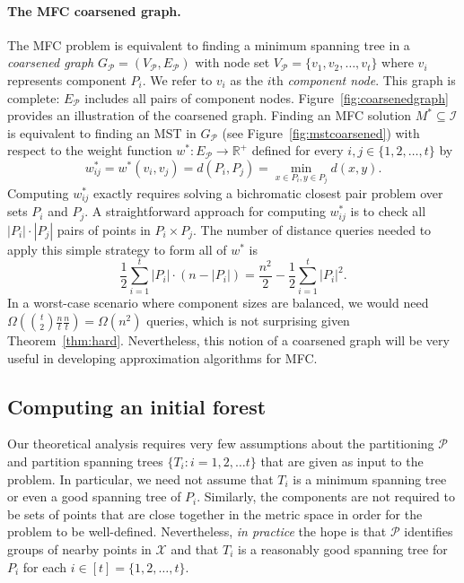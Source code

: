 \paragraph{The MFC coarsened graph.} The  MFC problem is equivalent to finding a minimum spanning tree in a \textit{coarsened graph} $G_\mathcal{P} = (V_\mathcal{P}, E_\mathcal{P})$ with node set $V_\mathcal{P} = \{v_1, v_2, \hdots, v_t\}$ where $v_i$ represents component $P_i$. We refer to $v_i$ as the $i$th \textit{component node}. This graph is complete: $E_\mathcal{P}$ includes all pairs of component nodes. Figure~\ref{fig:coarsenedgraph} provides an illustration of the coarsened graph. Finding an MFC solution $M^* \subseteq \mathcal{I}$ is equivalent to finding an MST in $G_\mathcal{P}$ (see Figure~\ref{fig:mstcoarsened}) with respect to the weight function $w^* \colon E_\mathcal{P} \rightarrow \mathbb{R}^+$ defined for every $i, j \in \{1,2, \hdots, t\}$ by
\begin{equation}
	\label{eq:wstar}
	w^*_{ij} = w^*(v_i, v_j) = d(P_i, P_j) = \min_{x \in P_i, y\in P_j} d(x,y).
\end{equation}
Computing $w_{ij}^*$ exactly requires solving a bichromatic closest pair problem over sets $P_i$ and $P_j$. A straightforward approach for computing $w_{ij}^*$ is to check all $|P_i|\cdot |P_j|$ pairs of points in $P_i \times P_j$. The number of distance queries needed to apply this simple strategy to form all of $w^*$ is
\begin{equation*} 
	\frac{1}{2}\sum_{i = 1}^t |P_i| \cdot (n - |P_i|) = \frac{n^2}{2} - \frac{1}{2} \sum_{i = 1}^t |P_i|^2.
\end{equation*}
In a worst-case scenario where component sizes are balanced, we would need
$\Omega\left({t \choose 2} \frac{n}{t} \frac{n}{t}\right) = \Omega(n^2)$ 
queries, which is not surprising given Theorem~\ref{thm:hard}. Nevertheless, this notion of a coarsened graph will be very useful in developing approximation algorithms for MFC.

\subsection{Computing an initial forest}
\label{sec:initialforest}
Our theoretical analysis requires very few assumptions about the partitioning $\mathcal{P}$ and partition spanning trees $\{T_i \colon i = 1,2, \hdots t\}$ that are given as input to the \mfc{} problem. In particular, we need not assume that $T_i$ is a minimum spanning tree or even a good spanning tree of $P_i$. Similarly, the components are not required to be sets of points that are close together in the metric space in order for the problem to be well-defined. Nevertheless, \textit{in practice} the hope is that $\mathcal{P}$ identifies groups of nearby points in $\mathcal{X}$ and that $T_i$ is a reasonably good spanning tree for $P_i$ for each $i \in [t] = \{1,2, \hdots, t\}$. 

